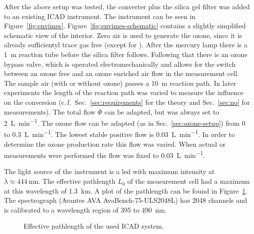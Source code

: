 After the above setup was tested, the converter plus the silica gel
filter was added to an existing ICAD instrument. The instrument can be seen in
Figure~\ref{fig:envimes}. Figure~\ref{fig:envimes-schematic} contains
a slightly simplified schematic view of the interior. Zero air is used
to generate the ozone, since it is already sufficientyl trace gas free
(except for ). After the mercury lamp there is a
\SI{1}{\meter} reaction tube before the silica filter
follows. Following that there is an ozone bypass valve, which is
operated electromechanically and allows for the switch between an
ozone free and an ozone enriched air flow in the measurement cell. The sample
air (with or without ozone) passes a \SI{10}{\meter} reaction path. In
later experiments the length of the reaction path was varied to
measure the influence on the  conversion (c.\,f.\
Sec.~\ref{sec:requirements} for the theory and Sec.~\ref{sec:no} for
measurements). The total flow $\Phi$ can be adapted, but was always
set to \SI{2}{\liter\per\minute}. The ozone flow can be adapted (as in
Sec.~\ref{sec:ozone-setup}) from 0 to \SI{0.3}{\liter\per\minute}. The
lowest stable positive flow is \SI{0.03}{\liter\per\minute}. In order
to determine the ozone production rate this flow was varied. When
actual \ch{NO} or \ch{NO_x} measurements were performed the flow was
fixed to \SI{0.03}{\liter\per\minute}.

The light source of the instrument is a led with maximum intensity at
$\lambda \approx \SI{444}{\nano\meter}$. The effective pathlength
$L_0$ of the measurement cell had a maximum at this wavelength of
\SI{1.3}{\kilo\meter}. A plot of the pathlength can be found in
Figure~\ref{fig:pathlength}. The spectrograph (Avantes AVA
AvaBench-75-ULS2048L) has \num{2048} channels and is calibrated to a
wavelength region of \num{395} to \SI{490}{\nano\meter}.

\begin{figure}[htbp]
  \centering
  
  \caption{Effective pathlength of the used ICAD system.}
  \label{fig:pathlength}
\end{figure}

